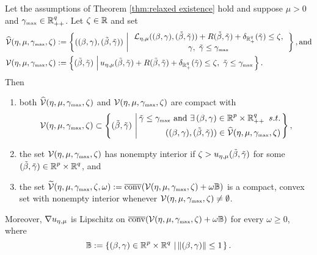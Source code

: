 \begin{lemma}\label{lem:grad u lip}
Let the assumptions of Theorem \ref{thm:relaxed existence} hold and suppose
$\mu>0$ and ${\gamma_{\mbox{\tiny max}}}\in\operatorname{\mathbb{R}}^q_{++}$. Let $\zeta\in\operatorname{\mathbb{R}}$ and set 
\[
\begin{aligned}
\widehat\VV(\eta,\mu,\gammax,\zeta)&:=
\lset{(\bg,\tbg)}{\begin{array}{c}
\LL_{\emu}(\bg,\tbg) + R\tbg+\del_{\R^q_+}(\tgam)\le\zeta,\\ \gam,\ \tgam\le\gammax\end{array}},
\text{and}
\\
\VV(\eta,\mu,\gammax,\zeta)&:=\lset{\tbg}{\uemu\tbg + R\tbg+\del_{\Rqp}(\tgam)\le\zeta,\ \tgam\le\gammax}.
\end{aligned}
\]
Then 
\begin{enumerate}
\item
both $\widehat{{\mathcal{V}}}(\eta,\mu,{\gamma_{\mbox{\tiny max}}},\zeta)$ and 
${\mathcal{V}}(\eta,\mu,{\gamma_{\mbox{\tiny max}}},\zeta)$ 
are compact with
\begin{equation}\label{eq:VV inclusion}
\VV(\eta,\mu,\gammax,\zeta)\subset\lset{\tbg}{\begin{aligned}\tgam\le\gammax
 \ \text{and}\ 
\exists\,\bg\in\Rp\times\R^q_{++}
\ s.t.
\\
(\bg,\tbg)\in\widehat\VV(\eta,\mu,\gammax,\zeta)
\end{aligned}},
\end{equation}
\item
the set ${\mathcal{V}}(\eta,\mu,{\gamma_{\mbox{\tiny max}}},\zeta)$ has nonempty interior if
$\zeta>{u_{\eta,\mu}}(\tilde\beta,{\tilde{\gamma}})$ for some $(\tilde\beta,{\tilde{\gamma}})\in{\operatorname{\mathbb{R}}^p}\times{\operatorname{\mathbb{R}}^q}$, and
\item
the set
$\widetilde{{\mathcal{V}}}(\eta,\mu,{\gamma_{\mbox{\tiny max}}},\zeta,\omega):=\overline{\mathrm{conv}}({\mathcal{V}}(\eta,\mu,{\gamma_{\mbox{\tiny max}}},\zeta)+\omega\mathbb{B})$ is a compact, convex set with nonempty interior
whenever ${\mathcal{V}}(\eta,\mu,{\gamma_{\mbox{\tiny max}}},\zeta)\ne\emptyset$.
\end{enumerate}
Moreover, $\nabla u_{\eta,\mu}$ is Lipschitz on $\overline{\mathrm{conv}}({\mathcal{V}}(\eta,\mu,{\gamma_{\mbox{\tiny max}}},\zeta)+\omega\mathbb{B})$
for every $\omega\ge 0$, where 
\[
\mathbb{B}:=\left\{(\beta,\gamma)\in{\operatorname{\mathbb{R}}^p}\times\operatorname{\mathbb{R}}^q\,\left|\,\left\Vert (\beta,\gamma)\right\Vert\le 1\right.\right\}.
\]
\end{lemma}
